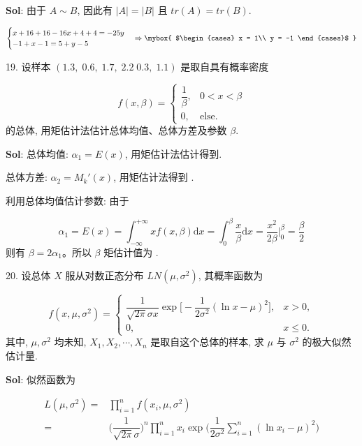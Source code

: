 \textbf{Sol}: 由于 $A\sim B$, 因此有 $|A|=|B|$ 且 $tr(A) = tr(B)$.

$$
\begin{cases}
    x+16+16-16x+4+4=-25y\\
    -1+x-1=5+y-5
\end{cases}
\Rightarrow
\mybox{
$\begin{cases}
    x = 1\\
    y = -1
\end{cases}$
}
$$

\vspace{12pt}

19. 设样本 $(1.3,\;0.6,\;1.7,\;2.2\;0.3,\;1.1)$ 是取自具有概率密度

$$
f(x,\beta)=\begin{cases}
\dfrac{1}{\beta},&0<x<\beta\\
0,&\text{else}.
\end{cases}
$$
的总体, 用矩估计法估计总体均值、总体方差及参数 $\beta$.

\textbf{Sol}:
总体均值: $\alpha_1=E(x)$, 用矩估计法估计得到.\par
总体方差: $\alpha_2=M_k'(x)$, 用矩估计法得到 .\par
利用总体均值估计参数: 由于

$$
\alpha_1=E(x)=\int_{-\infty}^{+\infty}xf(x,\beta)\text{d}x=\int_0^{\beta}\dfrac{x}{\beta}\text{d}x=\dfrac{x^2}{2\beta}\Bigg|_{0}^{\beta}=\dfrac{\beta}{2}
$$
则有 $\beta=2\alpha_1$。所以 $\beta$ 矩估计值为 .

\vspace{12pt}

20. 设总体 $X$ 服从对数正态分布 $LN(\mu,\sigma^2)$, 其概率函数为

$$
f(x,\mu,\sigma^2)=\begin{cases}
    \dfrac{1}{\sqrt{2\pi}\sigma x}\exp\Bigg[-\dfrac{1}{2\sigma^2}(\ln x-\mu)^2\Bigg],&x>0,\\
    0,&x\leqslant0.
\end{cases}
$$
其中, $\mu,\sigma^2$ 均未知, $X_1,X_2,\cdots,X_n$ 是取自这个总体的样本, 求 $\mu$ 与 $\sigma^2$ 的极大似然估计量.

\textbf{Sol}: 似然函数为

$$
\begin{aligned}
    L(\mu,\sigma^2)
=&\prod_{i=1}^nf(x_i,\mu,\sigma^2)\\
=&\Big(\dfrac{1}{\sqrt{2\pi}\sigma}\Big)^n
\prod_{i=1}^nx_i
\exp \Big(\dfrac{1}{2\sigma^2}\sum_{i=1}^n(\ln x_i-\mu)^2\Big)
\end{aligned}
$$

